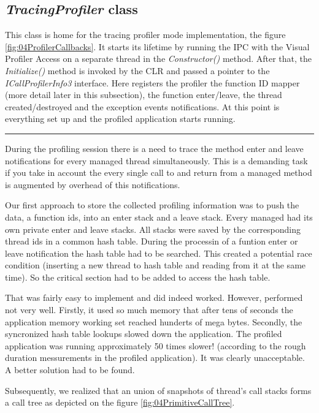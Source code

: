 \subsection{\textit{TracingProfiler} class}
This class is home for the tracing profiler mode implementation, the figure \ref{fig:04ProfilerCallbacks}. It starts its lifetime by running the IPC with the Visual Profiler Access on a separate thread in the \textit{Constructor()} method. After that, the \textit{Initialize()} method is invoked by the CLR and passed a pointer to the \textit{ICallProfilerInfo3} interface. Here registers the profiler the function ID mapper (more detail later in this subsection), the function enter/leave, the thread created/destroyed and the exception events notifications. At this point is everything set up and the profiled application starts running.

\begin{center}
\rule{300pt}{1.5pt}
\end{center}
During the profiling session there is a need to trace the method enter and leave notifications for every managed thread simultaneously. This is a demanding task if you take in account the every single call to and return from a managed method is augmented by overhead of this notifications. 

Our first approach to store the collected profiling information was to push the data, a function ids, into an enter stack and a leave stack. Every managed had its own private enter and leave stacks. All stacks were saved by the corresponding thread ids in a common hash table. During the processin of a funtion enter or leave notification the hash table had to be searched. This created a potential race condition (inserting a new thread to hash table and reading from it at the same time). So the critical section had to be added to access the hash table.

That was fairly easy to implement and did indeed worked. However, performed not very well. Firstly, it used so much memory that after tens of seconds the application memory working set reached hunderts of mega bytes. Secondly, the syncronized hash table lookups slowed down the application. The profiled application was running approximately 50 times slower! (according to the rough duration messurements in the profiled application). It was clearly unacceptable. A better solution had to be found. 

Subsequently, we realized that an union of snapshots of thread's call stacks forms a call tree as depicted on the figure \ref{fig:04PrimitiveCallTree}.


